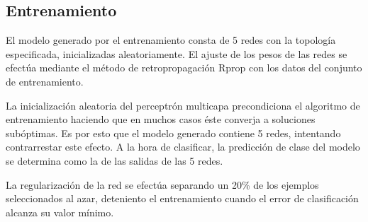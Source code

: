%
\subsection{Entrenamiento}
%
El modelo generado por el entrenamiento consta de 5 redes con la
topología especificada, inicializadas aleatoriamente.
El ajuste de los pesos de las redes se efectúa mediante el método de
retropropagación Rprop con los datos del conjunto de entrenamiento.

La inicialización aleatoria del perceptrón multicapa precondiciona el
algoritmo de entrenamiento haciendo que en muchos casos éste converja
a soluciones subóptimas.
Es por esto que el modelo generado contiene 5 redes, intentando
contrarrestar este efecto.
A la hora de clasificar, la predicción de clase del modelo se
determina como la  de las salidas de las 5 redes.

La regularización de la red se efectúa separando un 20\% de los
ejemplos seleccionados al azar, deteniento el entrenamiento cuando el
error de clasificación alcanza su valor mínimo.
